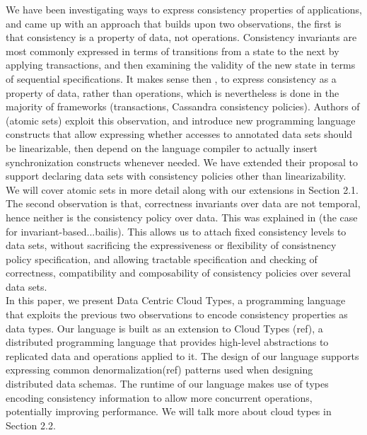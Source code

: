 We have been investigating ways to express consistency properties of
applications, and came up with an approach that builds upon two observations, the
first is that consistency is a property of data, not operations. Consistency
invariants are most commonly expressed in terms of transitions from a state to the
next by applying transactions, and then examining the validity of the new state
in terms of sequential specifications. It makes sense then , to express 
consistency as a property of data, rather than
operations, which is nevertheless is done in the majority of frameworks (transactions, Cassandra
consistency policies). Authors of (atomic sets) exploit this observation, and
introduce new programming language constructs that allow expressing whether
accesses to annotated data sets should be linearizable, then depend on the language compiler to
actually insert synchronization constructs whenever needed. We have extended
their proposal to support declaring data sets with consistency policies other
than linearizability. We will cover atomic sets in more detail along with our
extensions in Section 2.1. \\
The second observation is that, correctness invariants over data are not temporal, hence
neither is the consistency policy over data. This was explained in (the case for
invariant-based...bailis). This allows us to attach fixed consistency levels to
data sets, without sacrificing the expressiveness or flexibility of consistnency
policy specification, and allowing tractable specification and checking of
correctness, compatibility and composability of consistency policies over
several data sets. \\

In this paper, we present Data Centric Cloud Types, a programming language that
exploits the previous two observations to encode consistency properties as data
types. Our language is built as an extension to Cloud Types (ref), 
a distributed programming language that provides high-level abstractions to replicated
data and operations applied to it. The design of our language supports
expressing common denormalization(ref) patterns used when designing distributed
data schemas. The runtime of our language makes use of
types encoding 
consistency information to allow more concurrent operations, potentially
improving performance. We will talk more about cloud types in Section 2.2. \\

